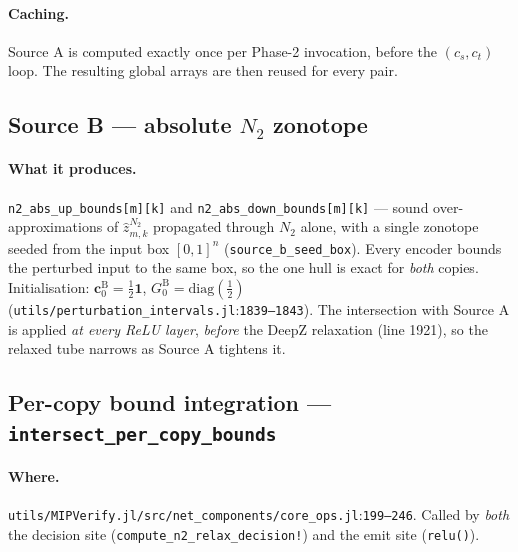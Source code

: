 \documentclass[11pt]{article}
\newcommand{\src}[1]{\texttt{\small #1}}
\newcommand{\fileline}[2]{\src{#1}:\src{#2}}
\begin{document}
\paragraph{Caching.}
Source A is computed exactly once per Phase-2 invocation, before the
$(c_s, c_t)$ loop. The resulting global arrays are then reused for
every pair.

\subsection{Source B --- absolute $N_2$ zonotope}

\paragraph{What it produces.}
\src{n2\_abs\_up\_bounds[m][k]} and \src{n2\_abs\_down\_bounds[m][k]}
--- sound over-approximations of $\hat z^{N_2}_{m,k}$ propagated
through $N_2$ alone, with a single zonotope seeded from the input
box $[0,1]^n$ (\src{source\_b\_seed\_box}). Every encoder bounds the
perturbed input to the same box, so the one hull is exact for
\emph{both} copies. Initialisation:
$\mathbf c^{\mathrm{B}}_0 = \tfrac12\mathbf 1$,
$G^{\mathrm{B}}_0 = \mathrm{diag}(\tfrac12)$
(\fileline{utils/perturbation\_intervals.jl}{1839--1843}). The
intersection with Source A is applied \emph{at every ReLU layer},
\emph{before} the DeepZ relaxation (line 1921), so the relaxed tube
narrows as Source A tightens it.

\subsection{Per-copy bound integration --- \src{intersect\_per\_copy\_bounds}}

\paragraph{Where.}
\fileline{utils/MIPVerify.jl/src/net\_components/core\_ops.jl}{199--246}.
Called by \emph{both} the decision site (\src{compute\_n2\_relax\_decision!})
and the emit site (\src{relu()}).
\end{document}
